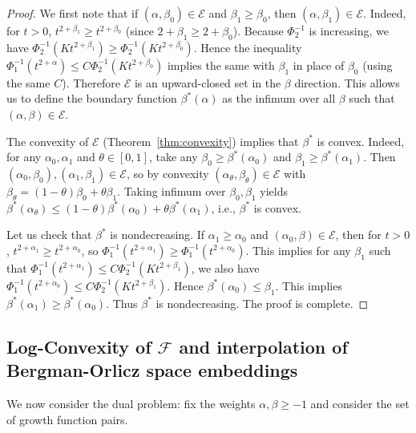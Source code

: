 \documentclass[12pt]{amsart}
\begin{document}
\begin{proof}
We first note that if $(\alpha,\beta_0)\in\mathcal{E}$ and $\beta_1 \ge \beta_0$, then $(\alpha,\beta_1)\in\mathcal{E}$. Indeed, for $t>0$, $t^{2+\beta_1} \ge t^{2+\beta_0}$ (since $2+\beta_1 \ge 2+\beta_0$). Because $\Phi_2^{-1}$ is increasing, we have $\Phi_2^{-1}(Kt^{2+\beta_1}) \ge \Phi_2^{-1}(Kt^{2+\beta_0})$. Hence the inequality $\Phi_1^{-1}(t^{2+\alpha}) \le C\Phi_2^{-1}(Kt^{2+\beta_0})$ implies the same with $\beta_1$ in place of $\beta_0$ (using the same $C$). Therefore $\mathcal{E}$ is an upward-closed set in the $\beta$ direction. This allows us to define the boundary function $\beta^*(\alpha)$ as the infimum over all $\beta$ such that $(\alpha,\beta)\in\mathcal{E}$.

\medskip
The convexity of $\mathcal{E}$ (Theorem~\ref{thm:convexity}) implies that $\beta^*$ is convex. Indeed, for any $\alpha_0,\alpha_1$ and $\theta\in[0,1]$, take any $\beta_0\ge\beta^*(\alpha_0)$ and $\beta_1\ge\beta^*(\alpha_1)$. Then $(\alpha_0,\beta_0),(\alpha_1,\beta_1)\in\mathcal{E}$, so by convexity $(\alpha_\theta,\beta_\theta)\in\mathcal{E}$ with $\beta_\theta = (1-\theta)\beta_0+\theta\beta_1$. Taking infimum over $\beta_0,\beta_1$ yields $\beta^*(\alpha_\theta) \le (1-\theta)\beta^*(\alpha_0)+\theta\beta^*(\alpha_1)$, i.e., $\beta^*$ is convex.

\medskip
Let us check that $\beta^*$ is nondecreasing. If $\alpha_1 \ge \alpha_0$ and $(\alpha_0,\beta)\in\mathcal{E}$, then for $t>0$, $t^{2+\alpha_1} \ge t^{2+\alpha_0}$, so $\Phi_1^{-1}(t^{2+\alpha_1}) \ge \Phi_1^{-1}(t^{2+\alpha_0})$. This implies for any $\beta_1$ such that $\Phi_1^{-1}(t^{2+\alpha_1})\leq C\Phi_2^{-1}(Kt^{2+\beta_1})$, we also have $\Phi_1^{-1}(t^{2+\alpha_0})\leq C\Phi_2^{-1}(Kt^{2+\beta_1})$. Hence $\beta^*(\alpha_0)\leq \beta_1$. This implies $\beta^*(\alpha_1) \ge \beta^*(\alpha_0)$. Thus $\beta^*$ is nondecreasing. The proof is complete.
\end{proof}

\subsection{Log-Convexity of $\mathcal{F}$ and interpolation of Bergman-Orlicz space embeddings}

We now consider the dual problem: fix the weights $\alpha,\beta \ge -1$ and
consider the set of growth function pairs.
\end{document}
